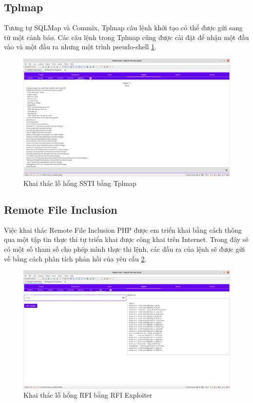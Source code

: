 \documentclass[./../main.tex]{subfiles}
\begin{document}
\subsection{Tplmap}
Tương tự SQLMap và Commix, Tplmap  câu lệnh khởi tạo có thể được gửi
sang từ một cảnh báo.
Các câu lệnh trong Tplmap cũng được cài đặt để nhận một đầu vào và
một đầu ra nhưng một trình pseudo-shell \ref{fig:tplmap_exploit}.

\begin{figure}[ht!]
	\includegraphics[width=\linewidth]{./images/tplmap_exploit.png}
	\caption{Khai thác lỗ hổng SSTI bằng Tplmap}
	\label{fig:tplmap_exploit}
\end{figure}

\subsection{Remote File Inclusion}

Việc khai thác Remote File Inclusion PHP được em triển khai bằng cách
thông qua một tập tin thực thi tự triển khai được công khai trên Internet.
Trong đây sẽ có một số tham số cho phép mình thực thi lệnh, các đầu ra
của lệnh sẽ được gửi về bằng cách phân tích phản hồi của yêu cầu \ref{fig:rfi_exploit}.

\begin{figure}[ht!]
	\includegraphics[width=\linewidth]{./images/rfi_exploit.png}
	\caption{Khai thác lỗ hổng RFI bằng RFI Exploiter}
	\label{fig:rfi_exploit}
\end{figure}
\end{document}
